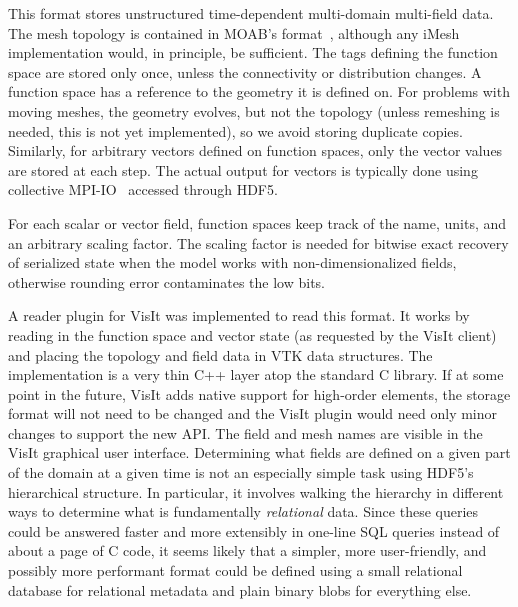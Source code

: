This format stores unstructured time-dependent multi-domain multi-field data.
The mesh topology is contained in MOAB's format~\citep{moab}, although any iMesh implementation would, in principle, be sufficient.
The tags defining the function space are stored only once, unless the connectivity or distribution changes.
A function space has a reference to the geometry it is defined on.
For problems with moving meshes, the geometry evolves, but not the topology (unless remeshing is needed, this is not yet implemented), so we avoid storing duplicate copies.
Similarly, for arbitrary vectors defined on function spaces, only the vector values are stored at each step.
The actual output for vectors is typically done using collective MPI-IO~\citep{corbett1995overview} accessed through HDF5.

For each scalar or vector field, function spaces keep track of the name, units, and an arbitrary scaling factor.
The scaling factor is needed for bitwise exact recovery of serialized state when the model works with non-dimensionalized fields, otherwise rounding error contaminates the low bits.

A reader plugin for VisIt was implemented to read this format.
It works by reading in the function space and vector state (as requested by the VisIt client) and placing the topology and field data in VTK data structures.
The implementation is a very thin C++ layer atop the standard C library.
If at some point in the future, VisIt adds native support for high-order elements, the storage format will not need to be changed and the VisIt plugin would need only minor changes to support the new API.
The field and mesh names are visible in the VisIt graphical user interface.
Determining what fields are defined on a given part of the domain at a given time is not an especially simple task using HDF5's hierarchical structure.
In particular, it involves walking the hierarchy in different ways to determine what is fundamentally \emph{relational} data.
Since these queries could be answered faster and more extensibly in one-line SQL queries instead of about a page of C code, it seems likely that a simpler, more user-friendly, and possibly more performant format could be defined using a small relational database for relational metadata and plain binary blobs for everything else.
